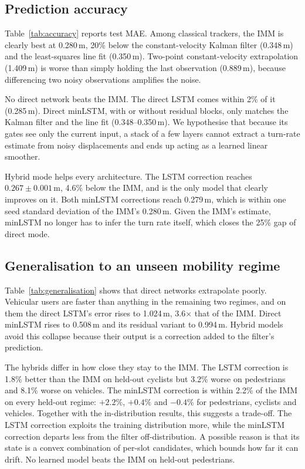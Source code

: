 \documentclass[conference]{IEEEtran}
\begin{document}
\subsection{Prediction accuracy}

Table~\ref{tab:accuracy} reports test MAE. Among classical trackers, the IMM
is clearly best at 0.280\,m, 20\% below the constant-velocity Kalman filter
(0.348\,m) and the least-squares line fit (0.350\,m). Two-point
constant-velocity extrapolation (1.409\,m) is worse than simply holding the
last observation (0.889\,m), because differencing two noisy observations
amplifies the noise.

No direct network beats the IMM. The direct LSTM comes within 2\% of it
(0.285\,m). Direct minLSTM, with or without residual blocks, only matches the
Kalman filter and the line fit (0.348--0.350\,m). We hypothesise that because
its gates see only the current input, a stack of a few layers cannot extract a
turn-rate estimate from noisy displacements and ends up acting as a learned
linear smoother.

Hybrid mode helps every architecture. The LSTM correction reaches
$0.267\pm0.001$\,m, 4.6\% below the IMM, and is the only model that clearly
improves on it. Both minLSTM corrections reach 0.279\,m, which is within one seed
standard deviation of the IMM's 0.280\,m. Given the IMM's estimate, minLSTM
no longer has to infer the turn rate itself, which closes the 25\% gap of
direct mode.

\subsection{Generalisation to an unseen mobility regime}

Table~\ref{tab:generalisation} shows that direct networks extrapolate poorly.
Vehicular users are faster than anything in the remaining two regimes, and on
them the direct LSTM's error rises to 1.024\,m, 3.6$\times$ that of the IMM.
Direct minLSTM rises to 0.508\,m and its residual variant to 0.994\,m. Hybrid
models avoid this collapse because their output is a correction added to the
filter's prediction.

The hybrids differ in how close they stay to the IMM. The LSTM correction is
1.8\% better than the IMM on held-out cyclists but 3.2\% worse on pedestrians
and 8.1\% worse on vehicles. The minLSTM correction is within 2.2\% of the IMM
on every held-out regime: $+2.2\%$, $+0.4\%$ and $-0.4\%$ for pedestrians,
cyclists and vehicles. Together with the in-distribution results, this
suggests a trade-off. The LSTM correction exploits the training distribution
more, while the minLSTM correction departs less from the filter
off-distribution. A possible reason is that its state is a convex
combination of per-slot candidates, which bounds how far it can drift. No learned model beats
the IMM on held-out pedestrians.
\end{document}
